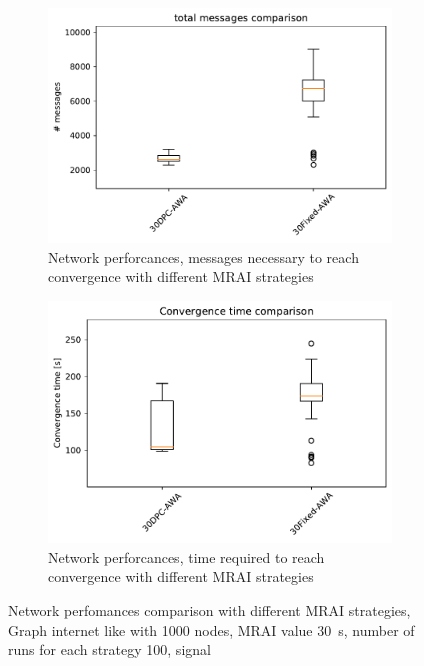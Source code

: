 \begin{figure}[h]
     \centering
     \begin{subfigure}[b]{0.45\textwidth}
         \centering
         \includegraphics[width=\textwidth]{images/internet_like/1000/comparison/comparison_AWA_messages_boxplot.pdf}
		 \caption{Network perforcances, messages necessary to reach convergence
			with different \ac{MRAI} strategies}
         \label{fig:boxplot_internet_like_1000_messages_AWA}
     \end{subfigure}
     \hfill
     \begin{subfigure}[b]{0.45\textwidth}
         \centering
         \includegraphics[width=\textwidth]{images/internet_like/1000/comparison/comparison_AWA_time_boxplot.pdf}
		 \caption{Network perforcances, time required to reach convergence
			with different \ac{MRAI} strategies}
         \label{fig:boxplot_internet_like_1000_time_AWA}
     \end{subfigure}
	 \caption{Network perfomances comparison with different \ac{MRAI} strategies,
		Graph internet like with \num{1000} nodes, \ac{MRAI} value 
		\SI{30}{\second}, number of runs for each strategy \num{100}, signal }
        \label{fig:boxplot_internet_like_1000_AWA}
\end{figure}

